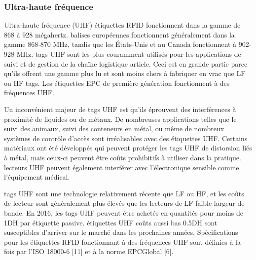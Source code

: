 \documentclass[11pt, a4paper, twoside]{book}
\begin{document}
\subsubsection{Ultra-haute fréquence}
Ultra-haute fréquence (UHF) étiquettes RFID fonctionnent dans la gamme de 868 à 928 mégahertz. balises européennes fonctionnent généralement dans la gamme 868-870 MHz, tandis que les États-Unis et au Canada fonctionnent à 902-928 MHz. tags UHF sont les plus couramment utilisés pour les applications de suivi et de gestion de la chaîne logistique article. Ceci est en grande partie parce qu'ils offrent une gamme plus lu et sont moins chers à fabriquer en vrac que LF ou HF tags. Les étiquettes EPC de première génération fonctionnent à des fréquences UHF.

Un inconvénient majeur de tags UHF est qu'ils éprouvent des interférences à proximité de liquides ou de métaux. De nombreuses applications telles que le suivi des animaux, suivi des conteneurs en métal, ou même de nombreux systèmes de contrôle d'accès sont irréalisables avec des étiquettes UHF. Certains matériaux ont été développés qui peuvent protéger les tags UHF de distorsion liés à métal, mais ceux-ci peuvent être coûts prohibitifs à utiliser dans la pratique. lecteurs UHF peuvent également interférer avec l'électronique sensible comme l'équipement médical.

tags UHF sont une technologie relativement récente que LF ou HF, et les coûts de lecteur sont généralement plus élevés que les lecteurs de LF faible largeur de bande. En 2016, les tags UHF peuvent être achetés en quantités pour moins de 1DH par étiquette passive. étiquettes UHF coûts aussi bas  0.5DH sont susceptibles d'arriver sur le marché dans les prochaines années. Spécifications pour les étiquettes RFID fonctionnant à des fréquences UHF sont définies à la fois par l'ISO 18000-6 [11] et à la norme EPCGlobal [6].
\end{document}
